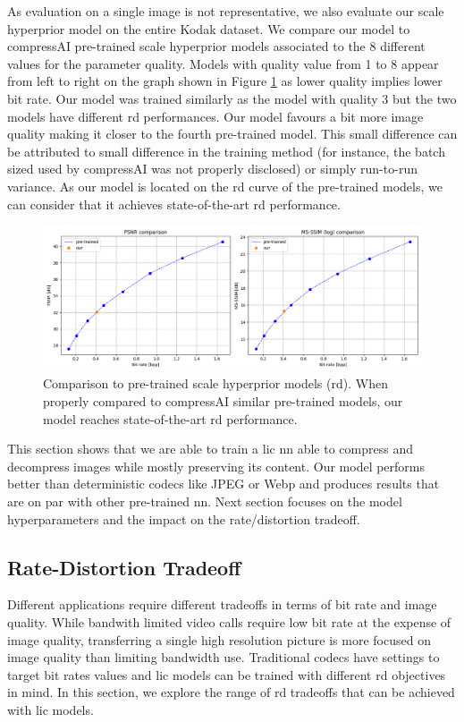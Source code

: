As evaluation on a single image is not representative, we also evaluate our scale hyperprior model on the entire Kodak dataset. We compare our model to compressAI pre-trained scale hyperprior models associated to the 8 different values for the parameter \textsf{quality}. Models with \textsf{quality} value from 1 to 8 appear from left to right on the graph shown in Figure \ref{balle_repro_6} as lower quality implies lower bit rate. Our model was trained similarly as the model with \textsf{quality} 3 but the two models have different \acrshort{rd} performances. Our model favours a bit more image quality making it closer to the fourth pre-trained model. This small difference can be attributed to small difference in the training method (for instance, the batch sized used by compressAI was not properly disclosed) or simply run-to-run variance. As our model is located on the \acrshort{rd} curve of the pre-trained models, we can consider that it achieves state-of-the-art \acrshort{rd} performance. 

\begin{figure}
    \centering
    \includegraphics[width=15cm]{img/balle_repro_rd_2.png}
    \caption[Comparison to pre-trained scale hyperprior models (\acrlong{rd}).]{Comparison to pre-trained scale hyperprior models (\acrlong{rd}). When properly compared to compressAI similar pre-trained models, our model reaches state-of-the-art \acrshort{rd} performance.}
    \label{balle_repro_6}
\end{figure}

This section shows that we are able to train a \acrshort{lic} \acrshort{nn} able to compress and decompress images while mostly preserving its content. Our model performs better than deterministic codecs like JPEG or Webp and produces results that are on par with other pre-trained \acrshort{nn}. Next section focuses on the model hyperparameters and the impact on the rate/distortion tradeoff.

\subsection{Rate-Distortion Tradeoff}
Different applications require different tradeoffs in terms of bit rate and image quality. While bandwith limited video calls require low bit rate at the expense of image quality, transferring a single high resolution picture is more focused on image quality than limiting bandwidth use. Traditional codecs have settings to target bit rates values and \acrshort{lic} models can be trained with different \acrshort{rd} objectives in mind. In this section, we explore the range of \acrshort{rd} tradeoffs that can be achieved with \acrshort{lic} models.

